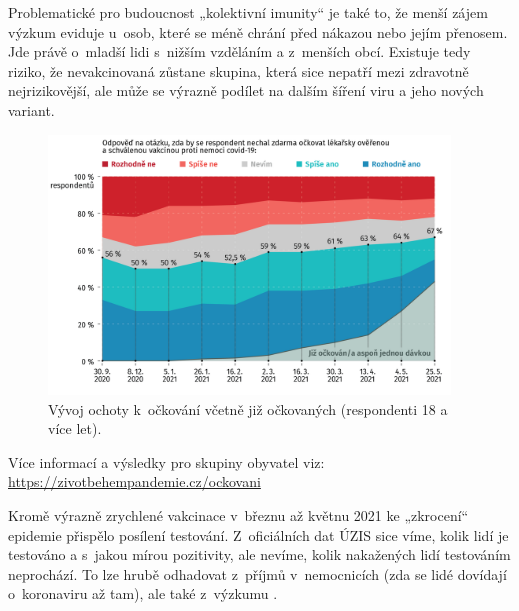 Problematické pro budoucnost „kolektivní imunity“ je také to, že menší zájem výzkum eviduje u~osob, které se méně chrání před nákazou nebo jejím přenosem. Jde právě o~mladší lidi s nižším vzděláním a z menších obcí. Existuje tedy riziko, že nevakcinovaná zůstane skupina, která sice nepatří mezi zdravotně nejrizikovější, ale může se výrazně podílet na dalším šíření viru a jeho nových variant.

\begin{figure}[ht]
    \centering
    \includegraphics[width=0.95\textwidth]{./pic/zbp-graf6.png}
    \caption{Vývoj ochoty k očkování včetně již očkovaných (respondenti 18 a více let).}
    \label{fig:zbp6}
\end{figure}

Více informací a výsledky pro skupiny obyvatel viz: \url{https://zivotbehempandemie.cz/ockovani}

Kromě výrazně zrychlené vakcinace v březnu až květnu 2021 ke „zkrocení“ epidemie přispělo posílení testování. Z oficiálních dat ÚZIS sice víme, kolik lidí je testováno a s jakou mírou pozitivity, ale nevíme, kolik nakažených lidí testováním neprochází. To lze hrubě odhadovat z příjmů v nemocnicích (zda se lidé dovídají o~koronaviru až tam), ale také z výzkumu . 

